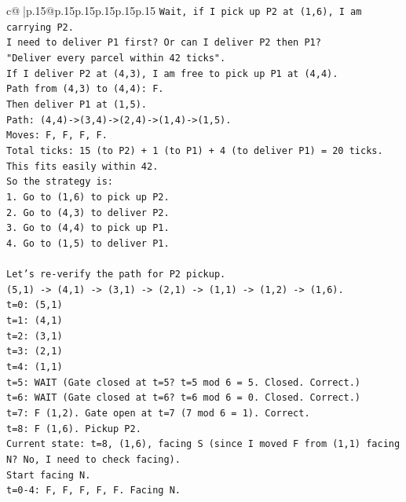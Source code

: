 \documentclass{article}
\begin{document}
{\begin{supertabular}{c@{$\;$}|p{.15\linewidth}@{}p{.15\linewidth}p{.15\linewidth}p{.15\linewidth}p{.15\linewidth}p{.15\linewidth}}
{{{\texttt{Wait, if I pick up P2 at (1,6), I am carrying P2.} \\
\texttt{I need to deliver P1 first? Or can I deliver P2 then P1?} \\
\texttt{"Deliver every parcel within 42 ticks".} \\
\texttt{If I deliver P2 at (4,3), I am free to pick up P1 at (4,4).} \\
\texttt{Path from (4,3) to (4,4): F.} \\
\texttt{Then deliver P1 at (1,5).} \\
\texttt{Path: (4,4){-}>(3,4){-}>(2,4){-}>(1,4){-}>(1,5).} \\
\texttt{Moves: F, F, F, F.} \\
\texttt{Total ticks: 15 (to P2) + 1 (to P1) + 4 (to deliver P1) = 20 ticks.} \\
\texttt{This fits easily within 42.} \\
\texttt{So the strategy is:} \\
\texttt{1. Go to (1,6) to pick up P2.} \\
\texttt{2. Go to (4,3) to deliver P2.} \\
\texttt{3. Go to (4,4) to pick up P1.} \\
\texttt{4. Go to (1,5) to deliver P1.} \\
\\ 
\texttt{Let's re{-}verify the path for P2 pickup.} \\
\texttt{(5,1) {-}> (4,1) {-}> (3,1) {-}> (2,1) {-}> (1,1) {-}> (1,2) {-}> (1,6).} \\
\texttt{t=0: (5,1)} \\
\texttt{t=1: (4,1)} \\
\texttt{t=2: (3,1)} \\
\texttt{t=3: (2,1)} \\
\texttt{t=4: (1,1)} \\
\texttt{t=5: WAIT (Gate closed at t=5? t=5 mod 6 = 5. Closed. Correct.)} \\
\texttt{t=6: WAIT (Gate closed at t=6? t=6 mod 6 = 0. Closed. Correct.)} \\
\texttt{t=7: F (1,2). Gate open at t=7 (7 mod 6 = 1). Correct.} \\
\texttt{t=8: F (1,6). Pickup P2.} \\
\texttt{Current state: t=8, (1,6), facing S (since I moved F from (1,1) facing N? No, I need to check facing).} \\
\texttt{Start facing N.} \\
\texttt{t=0{-}4: F, F, F, F, F. Facing N.} \\
}}}
\end{supertabular}}
\end{document}
